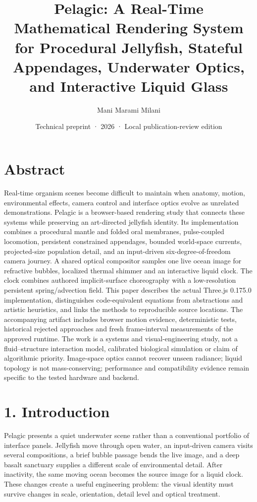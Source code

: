 \documentclass[
  english,
  11pt,
]{article}
\title{Pelagic: A Real-Time Mathematical Rendering System for Procedural
Jellyfish, Stateful Appendages, Underwater Optics, and Interactive
Liquid Glass}
\author{Mani Marami Milani}
\date{Technical preprint · 2026 · Local publication-review edition}
\begin{document}
\maketitle

\section{Abstract}\label{abstract}

Real-time organism scenes become difficult to maintain when anatomy,
motion, environmental effects, camera control and interface optics
evolve as unrelated demonstrations. Pelagic is a browser-based rendering
study that connects these systems while preserving an art-directed
jellyfish identity. Its implementation combines a procedural mantle and
folded oral membranes, pulse-coupled locomotion, persistent constrained
appendages, bounded world-space currents, projected-size population
detail, and an input-driven six-degree-of-freedom camera journey. A
shared optical compositor samples one live ocean image for refractive
bubbles, localized thermal shimmer and an interactive liquid clock. The
clock combines authored implicit-surface choreography with a
low-resolution persistent spring/advection field. This paper describes
the actual Three.js 0.175.0 implementation, distinguishes
code-equivalent equations from abstractions and artistic heuristics, and
links the methods to reproducible source locations. The accompanying
artifact includes browser motion evidence, deterministic tests,
historical rejected approaches and fresh frame-interval measurements of
the approved runtime. The work is a systems and visual-engineering
study, not a fluid--structure interaction model, calibrated biological
simulation or claim of algorithmic priority. Image-space optics cannot
recover unseen radiance; liquid topology is not mass-conserving;
performance and compatibility evidence remain specific to the tested
hardware and backend.

\section{1. Introduction}\label{introduction}

Pelagic presents a quiet underwater scene rather than a conventional
portfolio of interface panels. Jellyfish move through open water, an
input-driven camera visits several compositions, a brief bubble passage
bends the live image, and a deep basalt sanctuary supplies a different
scale of environmental detail. After inactivity, the same moving ocean
becomes the source image for a liquid clock. These changes create a
useful engineering problem: the visual identity must survive changes in
scale, orientation, detail level and optical treatment.
\end{document}
